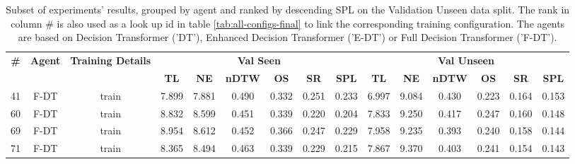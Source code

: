 \begin{table}
\centering
\caption{\label{tab:full_dt_ablation_dim}Subset of experiments' results, grouped by agent and ranked by descending SPL on the Validation Unseen data split. The rank in column \# is also used as a look up id in table \ref{tab:all-configs-final} to link the corresponding training configuration.     \newline The agents are based on Decision Transformer ('DT'), Enhanced Decision Transformer ('E-DT') or Full Decision Transformer ('F-DT').}
\begin{tabular}{@{\hskip3pt}c@{\hskip3pt}c@{\hskip3pt}c@{\hskip3pt}c@{\hskip3pt}c@{\hskip3pt}c@{\hskip3pt}c@{\hskip3pt}c@{\hskip3pt}c@{\hskip3pt}c@{\hskip3pt}c@{\hskip3pt}c@{\hskip3pt}c@{\hskip3pt}c@{\hskip3pt}c}
\toprule
\textbf{\#} & \textbf{Agent} & \textbf{Training Details} & \multicolumn{6}{c}{\textbf{Val Seen}} & \multicolumn{6}{c}{\textbf{Val Unseen}} \\
\cmidrule(l){4-9} \cmidrule(l){10-15} \textbf{~} &     \textbf{~} &                \textbf{~} &       \textbf{TL} & \textbf{NE} & \textbf{nDTW} & \textbf{OS} & \textbf{SR} & \textbf{SPL} &         \textbf{TL} & \textbf{NE} & \textbf{nDTW} & \textbf{OS} & \textbf{SR} & \textbf{SPL} \\
\midrule
         41 &           F-DT &                     train &             7.899 &       7.881 &         0.490 &       0.332 &       0.251 &        0.233 &               6.997 &       9.084 &         0.430 &       0.223 &       0.164 &        0.153 \\
         60 &           F-DT &                     train &             8.832 &       8.599 &         0.451 &       0.339 &       0.220 &        0.204 &               7.833 &       9.250 &         0.417 &       0.247 &       0.160 &        0.148 \\
         69 &           F-DT &                     train &             8.954 &       8.612 &         0.452 &       0.366 &       0.247 &        0.229 &               7.958 &       9.235 &         0.393 &       0.240 &       0.158 &        0.144 \\
         71 &           F-DT &                     train &             8.365 &       8.494 &         0.463 &       0.339 &       0.229 &        0.215 &               7.867 &       9.370 &         0.403 &       0.241 &       0.154 &        0.143 \\
\bottomrule
\end{tabular}
\end{table}
